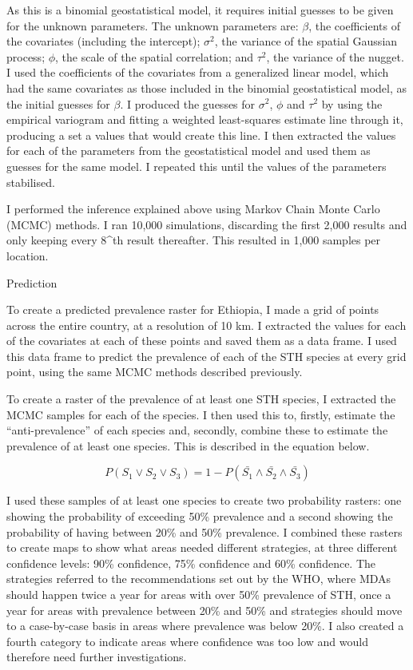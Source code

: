 \documentclass[
]{article}
\begin{document}
As this is a binomial geostatistical model, it requires initial guesses
to be given for the unknown parameters. The unknown parameters are:
\(\beta\), the coefficients of the covariates (including the intercept);
\(\sigma^2\), the variance of the spatial Gaussian process; \(\phi\),
the scale of the spatial correlation; and \(\tau^2\), the variance of
the nugget. I used the coefficients of the covariates from a generalized
linear model, which had the same covariates as those included in the
binomial geostatistical model, as the initial guesses for \(\beta\). I
produced the guesses for \(\sigma^2\), \(\phi\) and \(\tau^2\) by using
the empirical variogram and fitting a weighted least-squares estimate
line through it, producing a set a values that would create this line. I
then extracted the values for each of the parameters from the
geostatistical model and used them as guesses for the same model. I
repeated this until the values of the parameters stabilised.

I performed the inference explained above using Markov Chain Monte Carlo
(MCMC) methods. I ran 10,000 simulations, discarding the first 2,000
results and only keeping every 8\^{}th result thereafter. This resulted
in 1,000 samples per location.

Prediction

To create a predicted prevalence raster for Ethiopia, I made a grid of
points across the entire country, at a resolution of 10 km. I extracted
the values for each of the covariates at each of these points and saved
them as a data frame. I used this data frame to predict the prevalence
of each of the STH species at every grid point, using the same MCMC
methods described previously.

To create a raster of the prevalence of at least one STH species, I
extracted the MCMC samples for each of the species. I then used this to,
firstly, estimate the ``anti-prevalence'' of each species and, secondly,
combine these to estimate the prevalence of at least one species. This
is described in the equation below.

\[ P(S_1 \vee S_2 \vee S_3) = 1 - P(\bar{S_1} \wedge \bar{S_2} \wedge \bar{S_3}) \]

I used these samples of at least one species to create two probability
rasters: one showing the probability of exceeding 50\% prevalence and a
second showing the probability of having between 20\% and 50\%
prevalence. I combined these rasters to create maps to show what areas
needed different strategies, at three different confidence levels: 90\%
confidence, 75\% confidence and 60\% confidence. The strategies referred
to the recommendations set out by the WHO, where MDAs should happen
twice a year for areas with over 50\% prevalence of STH, once a year for
areas with prevalence between 20\% and 50\% and strategies should move
to a case-by-case basis in areas where prevalence was below 20\%. I also
created a fourth category to indicate areas where confidence was too low
and would therefore need further investigations.
\end{document}
